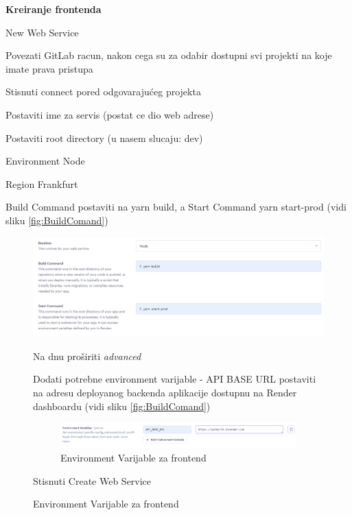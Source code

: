 \begin{packed_enum}
				\item \textbf{Kreiranje frontenda}
				\begin{itemize}
					\item New \textrightarrow Web Service
					\item Povezati GitLab racun, nakon cega su za odabir dostupni svi projekti na koje imate prava pristupa
					\item Stisnuti connect pored odgovarajućeg projekta
					\item Postaviti ime za servis (postat ce dio web adrese)
					\item Postaviti root directory (u nasem slucaju: dev)
					\item Environment Node
					\item Region Frankfurt
					\item Build Command postaviti na yarn build, a Start Command yarn start-prod (vidi sliku \ref{fig:BuildComand})
					\begin{figure}[H]
						\includegraphics[scale=0.5]{slike/BuildComand}
						\centering
						\caption{Build Comand za Node enviroment}
						\label{fig:BuildComand}
					\item Na dnu proširiti \textit{advanced}
					\item Dodati potrebne environment varijable - API BASE URL postaviti na adresu deployanog backenda aplikacije dostupnu na Render dashboardu (vidi sliku \ref{fig:BuildComand})
						\begin{figure}[H]
							\includegraphics[scale=0.5]{slike/EnvironmentVarijableFront}
							\centering
							\caption{Environment Varijable za frontend }
							\label{fig:EnvVarfront}
						\end{figure}
					\item Stisnuti Create Web Service
						
					\end{figure}
					\item
				\end{itemize}
			\end{packed_enum}
		
			
			
			